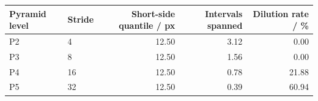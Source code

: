 \begin{tabular}{llrrr}
\toprule
Pyramid level & Stride & Short-side quantile / px & Intervals spanned & Dilution rate / \% \\
\midrule
P2 & 4 & 12.50 & 3.12 & 0.00 \\
P3 & 8 & 12.50 & 1.56 & 0.00 \\
P4 & 16 & 12.50 & 0.78 & 21.88 \\
P5 & 32 & 12.50 & 0.39 & 60.94 \\
\bottomrule
\end{tabular}
